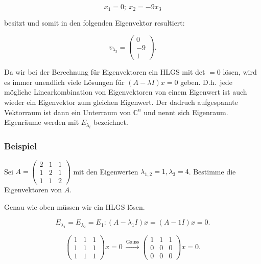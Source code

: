 \begin{equation*}
        x_1 = 0;\ x_2 = -9 x_3 
\end{equation*}

besitzt und somit in den folgenden Eigenvektor resultiert:

\begin{equation*}
        v_{\lambda_3} = \begin{pmatrix} 0 \\ -9 \\ 1 \end{pmatrix}.
\end{equation*}

Da wir bei der Berechnung für Eigenvektoren ein HLGS mit det \(= 0 \) lösen, wird es immer unendlich viele Lösungen für \( (A-\lambda I) x = 0 \) geben. D.h.\ jede mögliche Linearkombination von Eigenvektoren von einem Eigenwert ist auch wieder ein Eigenvektor zum gleichen Eigenwert. Der dadruch aufgespannte Vektorraum ist dann ein Unterraum von \( \mathbb{C}^n \) und nennt sich Eigenraum. Eigenräume werden mit \( E_{\lambda_i} \) bezeichnet.

\subsubsection*{Beispiel}

Sei \( A = \begin{pmatrix} 2 & 1 & 1 \\ 1 & 2 & 1 \\ 1 & 1 & 2 \end{pmatrix} \) mit den Eigenwerten \( \lambda_{1,2} = 1, \lambda_3 = 4 \). Bestimme die Eigenvektoren von \( A \).

\vspace{1\baselineskip}

Genau wie oben müssen wir ein HLGS lösen.

\begin{equation*}
    E_{\lambda_1} = E_{\lambda_2} = E_{1}: (A - \lambda_1 I) x = (A - 1I) x = 0.
\end{equation*}

\begin{equation*}
    \begin{pmatrix} 1 & 1 & 1 \\ 1 & 1 & 1 \\ 1 & 1 & 1 \end{pmatrix} x = 0 \ \xrightarrow[]{\text{Gauss}} \begin{pmatrix} 1 & 1 & 1 \\ 0 & 0 & 0 \\ 0 & 0 & 0 \end{pmatrix} x = 0.
\end{equation*}

